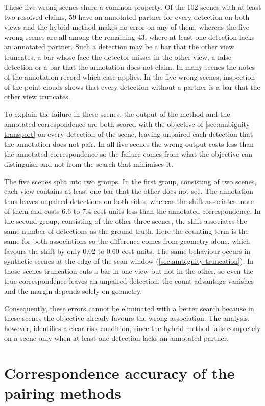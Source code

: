 \documentclass[a4paper, 12pt, twoside]{book}
\begin{document}
These five wrong scenes share a common property. Of the 102 scenes with at least two resolved claims, 59 have an annotated partner for every detection on both views and the hybrid method makes no error on any of them, whereas the five wrong scenes are all among the remaining 43, where at least one detection lacks an annotated partner. Such a detection may be a bar that the other view truncates, a bar whose face the detector misses in the other view, a false detection or a bar that the annotation does not claim. In many scenes the notes of the annotation record which case applies. In the five wrong scenes, inspection of the point clouds shows that every detection without a partner is a bar that the other view truncates.

To explain the failure in these scenes, the output of the method and the annotated correspondence are both scored with the objective of \cref{sec:ambiguity-transport} on every detection of the scene, leaving unpaired each detection that the annotation does not pair. In all five scenes the wrong output costs less than the annotated correspondence so the failure comes from what the objective can distinguish and not from the search that minimises it.

The five scenes split into two groups. In the first group, consisting of two scenes, each view contains at least one bar that the other does not see. The annotation thus leaves unpaired detections on both sides, whereas the shift associates more of them and costs 6.6 to 7.4 cost units less than the annotated correspondence. In the second group, consisting of the other three scenes, the shift associates the same number of detections as the ground truth. Here the counting term is the same for both associations so the difference comes from geometry alone, which favours the shift by only 0.02 to 0.60 cost units. The same behaviour occurs in synthetic scenes at the edge of the scan window (\cref{sec:ambiguity-truncation}). In those scenes truncation cuts a bar in one view but not in the other, so even the true correspondence leaves an unpaired detection, the count advantage vanishes and the margin depends solely on geometry.

Consequently, these errors cannot be eliminated with a better search because in these scenes the objective already favours the wrong association. The analysis, however, identifies a clear risk condition, since the hybrid method fails completely on a scene only when at least one detection lacks an annotated partner.

\section{Correspondence accuracy of the pairing methods}
\label{sec:eval-accuracy}
\end{document}
